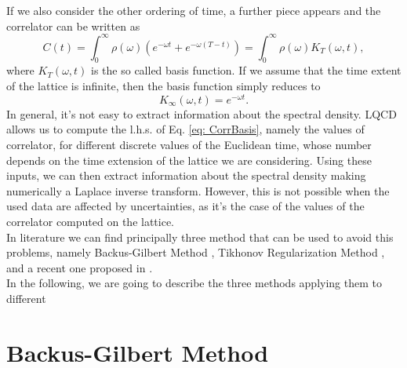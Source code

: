 \documentclass[a4paper,10pt]{article}
\begin{document}
If we also consider the other ordering of time, a further piece appears and the correlator can be written as
\begin{equation}\label{eq: CorrBasis}
C(t) = \int_0^\infty \rho(\omega) (e^{-\omega t} + e^{-\omega(T-t)}) = \int_0^\infty \rho(\omega) K_T(\omega, t),
\end{equation}
where $K_T(\omega, t)$ is the so called basis function. If we assume that the time extent of the lattice is infinite, then the basis function simply reduces to
\begin{equation}
K_\infty (\omega, t) = e^{-\omega t}.
\end{equation} 
In general, it's not easy to extract information about the spectral density. LQCD allows us to compute the l.h.s. of Eq. \eqref{eq: CorrBasis}, namely the values of correlator, for different discrete values of the Euclidean time, whose number depends on the time extension of the lattice we are considering. Using these inputs, we can then extract information about the spectral density making numerically a Laplace inverse transform. However, this is not possible when the used data are affected by uncertainties, as it's the case of the values of the correlator computed on the lattice. \\
In literature we can find principally three method that can be used to avoid this problems, namely Backus-Gilbert Method \cite{BG}, Tikhonov Regularization Method \cite{TR}, and a recent one proposed in \cite{Nazario}.\\
In the following, we are going to describe the three methods applying them to different 


\section{Backus-Gilbert Method}
\end{document}
